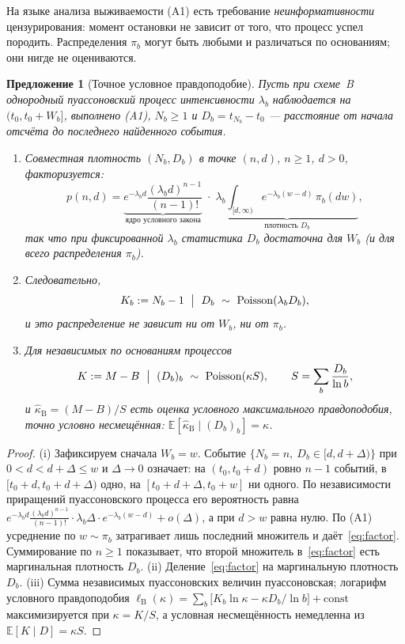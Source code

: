 \documentclass[11pt,a4paper]{article}
\theoremstyle{plain}
\newtheorem{proposition}{Предложение}
\theoremstyle{remark}
\DeclareMathOperator{\Pois}{Poisson}
\begin{document}
\medskip
\noindent На языке анализа выживаемости (A1) есть требование
\emph{неинформативности} цензурирования: момент остановки не зависит от того,
что процесс успел породить. Распределения $\pi_b$ могут быть любыми и различаться
по основаниям; они нигде не оцениваются.

\begin{proposition}[Точное условное правдоподобие]\label{prop:cond}
Пусть при схеме~B однородный пуассоновский процесс интенсивности $\lambda_b$
наблюдается на $(t_0,t_0+W_b]$, выполнено (A1), $N_b\ge1$ и $D_b=t_{N_b}-t_0$ ---
расстояние от начала отсчёта до последнего найденного события.
\begin{enumerate}
\item[\rm(i)] Совместная плотность $(N_b,D_b)$ в точке $(n,d)$, $n\ge1$, $d>0$,
факторизуется:
\begin{equation}\label{eq:factor}
p(n,d)=\underbrace{e^{-\lambda_bd}\frac{(\lambda_bd)^{n-1}}{(n-1)!}}_{\text{ядро условного закона}}
\;\cdot\;
\underbrace{\lambda_b\int_{[d,\infty)}e^{-\lambda_b(w-d)}\,\pi_b(dw)}_{\text{плотность }D_b},
\end{equation}
так что при фиксированной $\lambda_b$ статистика $D_b$ достаточна для $W_b$
(и для всего распределения $\pi_b$).
\item[\rm(ii)] Следовательно,
\begin{equation}\label{eq:condlaw}
K_b:=N_b-1\ \bigm|\ D_b\ \sim\ \Pois(\lambda_b D_b),
\end{equation}
и это распределение не зависит ни от $W_b$, ни от $\pi_b$.
\item[\rm(iii)] Для независимых по основаниям процессов
\begin{equation}\label{eq:pivotB}
K:=M-B\ \bigm|\ (D_b)_{b}\ \sim\ \Pois(\kappa S),\qquad
S=\sum_b\frac{D_b}{\ln b},
\end{equation}
и $\hat\kappa_{\mathrm B}=(M-B)/S$ есть оценка условного максимального
правдоподобия, точно условно несмещённая:
$\mathbb E[\hat\kappa_{\mathrm B}\mid (D_b)_b]=\kappa$.
\end{enumerate}
\end{proposition}

\begin{proof}
(i) Зафиксируем сначала $W_b=w$. Событие $\{N_b=n,\ D_b\in[d,d+\Delta)\}$ при
$0<d<d+\Delta\le w$ и $\Delta\to0$ означает: на $(t_0,t_0+d)$ ровно $n-1$
событий, в $[t_0+d,t_0+d+\Delta)$ одно, на $[t_0+d+\Delta,t_0+w]$ ни одного. По
независимости приращений пуассоновского процесса его вероятность равна
$e^{-\lambda_bd}\frac{(\lambda_bd)^{n-1}}{(n-1)!}\cdot\lambda_b\Delta\cdot
e^{-\lambda_b(w-d)}+o(\Delta)$, а при $d>w$ равна нулю. По (A1) усреднение по
$w\sim\pi_b$ затрагивает лишь последний множитель и даёт~\eqref{eq:factor}.
Суммирование по $n\ge1$ показывает, что второй множитель в~\eqref{eq:factor} есть
маргинальная плотность $D_b$.
(ii) Деление~\eqref{eq:factor} на маргинальную плотность $D_b$.
(iii) Сумма независимых пуассоновских величин пуассоновская; логарифм условного
правдоподобия $\ell_{\mathrm B}(\kappa)=\sum_b\bigl[K_b\ln\kappa-\kappa D_b/\ln b\bigr]
+\mathrm{const}$ максимизируется при $\kappa=K/S$, а условная несмещённость
немедленна из $\mathbb E[K\mid D]=\kappa S$.
\end{proof}
\end{document}
